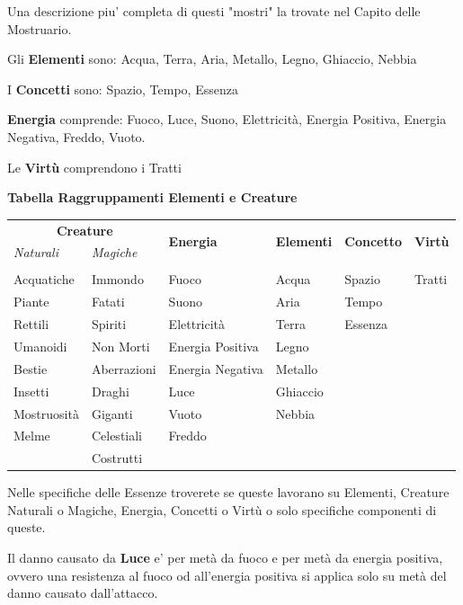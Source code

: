 \documentclass[a4paper,10 pt,twoside,openany]{book}
\begin{document}
Una descrizione piu' completa di questi "mostri" la trovate nel Capito delle Mostruario.

Gli \textbf{Elementi} sono: Acqua, Terra, Aria, Metallo, Legno, Ghiaccio, Nebbia

I \textbf{Concetti} sono: Spazio, Tempo, Essenza

\textbf{Energia} comprende: Fuoco, Luce, Suono, Elettricità, Energia Positiva, Energia Negativa, Freddo, Vuoto.

Le \textbf{Virtù} comprendono i Tratti


\bigskip

\textbf{Tabella Raggruppamenti Elementi e Creature}

\medskip
\begin{tabular}{llllll}
	\toprule
	\multicolumn{2}{c}{\textbf{Creature}} &\multirow{2}{*}{\textbf{Energia}}  &\multirow{2}{*}{\textbf{Elementi}}
	&\multirow{2}{*}{\textbf{Concetto}} &\multirow{2}{*}{\textbf{Virtù}}\\
	\textit{Naturali}& \textit{Magiche} \\
	\hline
	\\
	Acquatiche  & Immondo   	& Fuoco  			& Acqua 	& Spazio    & Tratti\\
	Piante      & Fatati   		& Suono  			& Aria   	& Tempo    	& \\
	Rettili     & Spiriti   	& Elettricità      	& Terra     & Essenza   & \\
	Umanoidi    & Non Morti 	& Energia Positiva 	& Legno     & 			& \\
	Bestie   	& Aberrazioni   & Energia Negativa 	& Metallo   &  			& \\
	Insetti		& Draghi		& Luce				& Ghiaccio 	&			& \\
	Mostruosità & Giganti     	& Vuoto  			& Nebbia 	&           & \\
	Melme		& Celestiali    & Freddo 			&		    &           & \\
	& Costrutti     &        			&		    &           & \\
\end{tabular}

\bigskip

Nelle specifiche delle Essenze troverete se queste lavorano su Elementi, Creature Naturali o Magiche, Energia, Concetti o Virtù o solo specifiche componenti di queste.

Il danno causato da \textbf{Luce} e' per metà da fuoco e per metà da energia positiva, ovvero una resistenza al fuoco od all'energia positiva si applica solo su metà del danno causato dall'attacco.
\end{document}
